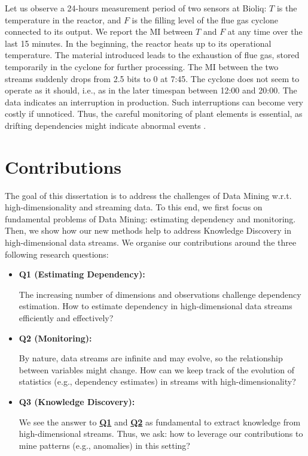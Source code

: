 \begin{example}
	Let us observe a 24-hours measurement period of two sensors at \gls{Bioliq}: $T$ is the temperature in the reactor, and $F$ is the filling level of the flue gas cyclone connected to its output. We report the \gls{MI} between $T$ and $F$ at any time over the last 15 minutes. 
	In the beginning, the reactor heats up to its operational temperature. The material introduced leads to the exhaustion of flue gas, stored temporarily in the cyclone for further processing. The  \gls{MI} between the two streams suddenly drops from 2.5 bits to 0 at 7:45. The cyclone does not seem to operate as it should, i.e., as in the later timespan between 12:00 and 20:00. The data indicates an interruption in production. Such interruptions can become very costly if unnoticed. Thus, the careful monitoring of plant elements is essential, as drifting dependencies might indicate abnormal events \cite{DBLP:journals/tim/Hashemian11}. 
\end{example}

\section{Contributions}

The goal of this dissertation is to address the challenges of Data Mining w.r.t. high-dimensionality and streaming data. To this end, we first focus on fundamental problems of Data Mining: estimating dependency and monitoring. Then, we show how our new methods help to address Knowledge Discovery in high-dimensional data streams. We organise our contributions around the three following research questions: 

\begin{itemize}[noitemsep]
	\item \hypertarget{Q1}{\textbf{Q1 (Estimating Dependency):}} The increasing number of dimensions and observations challenge dependency estimation. How to estimate dependency in high-dimensional data streams efficiently and effectively? 
	\item \hypertarget{Q2}{\textbf{Q2 (Monitoring):}} By nature, data streams are infinite and may evolve, so the relationship between variables might change. How can we keep track of the evolution of statistics (e.g., dependency estimates) in streams with high-dimensionality?  
	\item \hypertarget{Q3}{\textbf{Q3 (Knowledge Discovery):}} We see the answer to \hyperlink{Q1}{\textbf{Q1}} and \hyperlink{Q2}{\textbf{Q2}} as fundamental to extract knowledge from high-dimensional streams. Thus, we ask: how to leverage our contributions to mine patterns (e.g., anomalies) in this setting?  
\end{itemize} 

